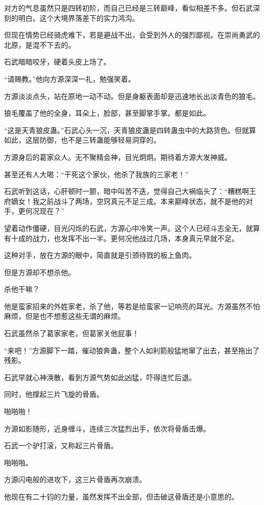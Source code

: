 \begin{this_body}
对方的气息虽然只是四转初阶，而自己已经是三转巅峰，看似相差不多。但石武深刻的明白。这个大境界落差下的实力鸿沟。

但现在情势已经骑虎难下，若是避战不出，会受到外人的强烈鄙视。在崇尚勇武的北原，是混不下去的。

石武暗暗咬牙，硬着头皮上场了。

“请赐教。”他向方源深深一礼，勉强笑着。

方源淡淡点头，站在原地一动不动。但是身躯表面却是迅速地长出淡青色的狼毛。

狼毛覆盖了他的全身，耳朵上，脸部，甚至脚掌手掌。都是如此。

“这是天青狼皮蛊。”石武心头一沉，天青狼皮蛊是四转蛊虫中的大路货色。但就算如此，这层防御，也不是三转蛊能够轻易洞穿的。

方源身后的葛家众人。无不聚精会神，目光炯炯。期待着方源大发神威。

甚至还有人大喝：“干死这个家伙，他杀了我族的三家老！”

石武听到这话，心肝顿时一颤，暗中叫苦不迭，觉得自己大祸临头了：“糟糕啊王府嫡女！我之前战斗了两场，空窍真元不足三成。本来巅峰状态，就不是他的对手，更何况现在？”

望着动作僵硬，目光闪烁的石武，方源心中冷笑一声。这个人已经斗志全无，就算有十成的战力，也发挥不出一半。更何况他战过几场，本身真元早就不足。

这种对手，放在方源的眼中，简直就是引颈待戮的板上鱼肉。

但是方源却不想杀他。

杀他干嘛？

他是蛮家招来的外姓家老，杀了他，等若是给蛮家一记响亮的耳光。方源虽然不怕麻烦，但是也不想惹这些无谓的麻烦。

石武虽然杀了葛家家老，但葛家关他屁事！

“来吧！”方源脚下一踏，催动狼奔蛊，整个人如利箭般猛地窜了出去，甚至拖出了残影。

石武早就心神涣散，看到方源气势如此凶猛，吓得连忙后退。

同时，他撑起三片飞旋的骨盾。

啪啪啪！

方源如影随形，近身缠斗，连续三次猛烈出手，依次将骨盾击爆。

石武一个驴打滚，又称起三片骨盾。

啪啪啪。

方源闪电般的进攻下，这三片骨盾再次崩溃。

他现在有二十钧的力量，虽然发挥不出全部，但击破这骨盾还是小意思的。


\end{this_body}
